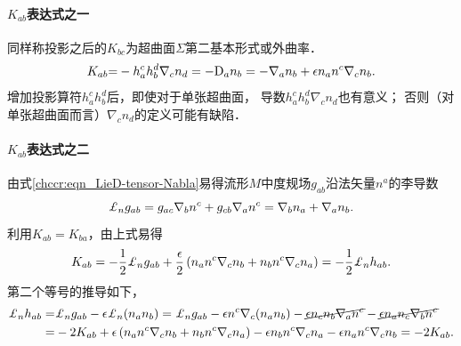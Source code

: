 



\paragraph{$K_{ab}$表达式之一}
同样称投影之后的$K_{bc}$为超曲面$\Sigma$第二基本形式或外曲率．
\begin{equation}\label{chsm:eqn_Kab-1}
    K_{ab} {=} -h_a^c h_b^d \nabla_{c} {n}_d =- {\rm D}_a n_b
     = -\nabla_{a} n_b + \epsilon n_a n^c \nabla_{c} n_b .
\end{equation}
增加投影算符$h_a^c h_b^d$后，即使对于单张超曲面，
导数$h_a^c h_b^d \nabla_{c} {n}_d$也有意义；
否则（对单张超曲面而言）$\nabla_{c} {n}_d$的定义可能有缺陷．



\paragraph{$K_{ab}$表达式之二}
由式\eqref{chccr:eqn_LieD-tensor-Nabla}易得流形$M$中度规场$g_{ab}$沿法矢量$n^a$的李导数
\begin{equation}
    \Lie_{n} g_{ab} =  g_{ac} \nabla_b n^c + g_{cb} \nabla_a n^c
      = \nabla_b n_a + \nabla_a n_b .
\end{equation}
利用$K_{ab}=K_{ba}$，由上式易得
\begin{equation}\label{chsm:eqn_Kab-2}
    K_{ab} = -\frac{1}{2}\Lie_{n} g_{ab} +
      \frac{\epsilon}{2}\left(n_a n^c \nabla_{c} n_b + n_b n^c \nabla_{c} n_a \right)
      =-\frac{1}{2}\Lie_{n} h_{ab}.
\end{equation}
第二个等号的推导如下，
\begin{align*}
    \Lie_{n} h_{ab} =& \Lie_{n} g_{ab} - \epsilon \Lie_{n}(n_a n_b) =
     \Lie_{n} g_{ab} -\epsilon n^c\nabla_c(n_a n_b) -\cancel{\epsilon n_c n_b \nabla_a n^c}
     -\cancel{\epsilon n_a n_c \nabla_b n^c} \\
    =& -2K_{ab}+\epsilon \left(n_a n^c \nabla_{c} n_b + n_b n^c \nabla_{c} n_a \right)
    -\epsilon n_b n^c\nabla_c n_a  -\epsilon n_a n^c\nabla_c n_b
    =-2K_{ab}.
\end{align*}

